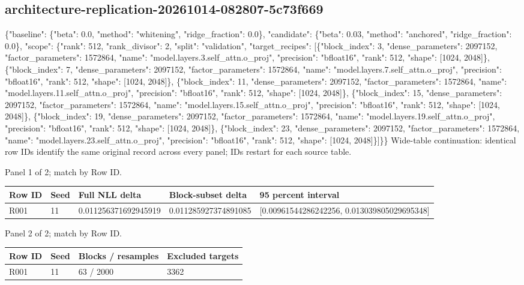 \documentclass[10pt]{article}
\begin{document}
\subsection{architecture-replication-20261014-082807-5c73f669}
\{"baseline": \{"beta": 0.0, "method": "whitening", "ridge\_fraction": 0.0\}, "candidate": \{"beta": 0.03, "method": "anchored", "ridge\_fraction": 0.0\}, "scope": \{"rank": 512, "rank\_divisor": 2, "split": "validation", "target\_recipes": [\{"block\_index": 3, "dense\_parameters": 2097152, "factor\_parameters": 1572864, "name": "model.layers.3.self\_attn.o\_proj", "precision": "bfloat16", "rank": 512, "shape": [1024, 2048]\}, \{"block\_index": 7, "dense\_parameters": 2097152, "factor\_parameters": 1572864, "name": "model.layers.7.self\_attn.o\_proj", "precision": "bfloat16", "rank": 512, "shape": [1024, 2048]\}, \{"block\_index": 11, "dense\_parameters": 2097152, "factor\_parameters": 1572864, "name": "model.layers.11.self\_attn.o\_proj", "precision": "bfloat16", "rank": 512, "shape": [1024, 2048]\}, \{"block\_index": 15, "dense\_parameters": 2097152, "factor\_parameters": 1572864, "name": "model.layers.15.self\_attn.o\_proj", "precision": "bfloat16", "rank": 512, "shape": [1024, 2048]\}, \{"block\_index": 19, "dense\_parameters": 2097152, "factor\_parameters": 1572864, "name": "model.layers.19.self\_attn.o\_proj", "precision": "bfloat16", "rank": 512, "shape": [1024, 2048]\}, \{"block\_index": 23, "dense\_parameters": 2097152, "factor\_parameters": 1572864, "name": "model.layers.23.self\_attn.o\_proj", "precision": "bfloat16", "rank": 512, "shape": [1024, 2048]\}]\}\}
Wide-table continuation: identical row IDs identify the same original record across every panel; IDs restart for each source table.
\par\noindent Panel 1 of 2; match by Row ID.
{\scriptsize\setlength{\tabcolsep}{2pt}
\begin{longtable}{p{}p{}p{}p{}p{}}
Row ID & Seed & Full NLL delta & Block-subset delta & 95 percent interval \\
\hline\endhead
R001 & 11 & 0.011256371692945919 & 0.011285927374891085 & [0.00961544286242256, 0.013039805029695348] \\
\end{longtable}}
\par\noindent Panel 2 of 2; match by Row ID.
{\scriptsize\setlength{\tabcolsep}{2pt}
\begin{longtable}{p{}p{}p{}p{}}
Row ID & Seed & Blocks / resamples & Excluded targets \\
\hline\endhead
R001 & 11 & 63 / 2000 & 3362 \\
\end{longtable}}
\end{document}
